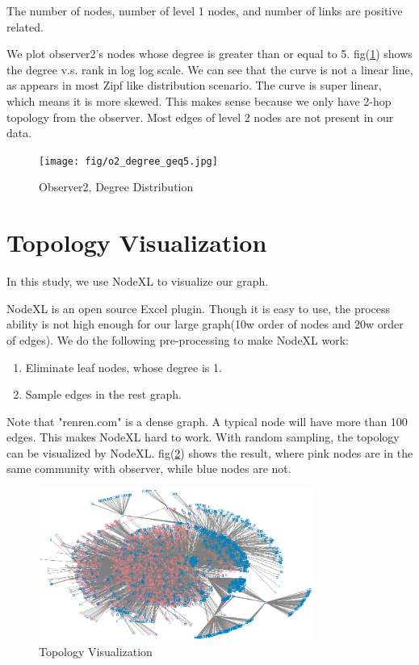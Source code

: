 \documentclass[11pt,a4paper]{article}
\begin{document}
The number of nodes, number of level 1 nodes, and number of links
are positive related.

We plot observer2's nodes whose degree is greater than or equal to 5. 
fig(\ref{fig:o2_degree}) shows the degree v.s. rank in log log scale. 
We can see that the curve is not a linear line, as appears 
in most Zipf like distribution scenario. The curve is 
super linear, which means it is more skewed. This makes
sense because we only have 2-hop topology from the observer. 
Most edges of level 2 nodes are not present in our data. 

\begin{figure}
	\centering
	\texttt{[image: fig/o2\_degree\_geq5.jpg]}
	\caption{Observer2, Degree Distribution}
	\label{fig:o2_degree}
\end{figure}

\section{Topology Visualization}

In this study, we use NodeXL \cite{nodexl} to visualize our graph. 

NodeXL is an open source Excel plugin. Though it is easy to use, 
the process ability is not high enough for our large graph(10w order 
of nodes and 20w order of edges). We do the following 
pre-processing to make NodeXL work:
\begin{enumerate}
	\item Eliminate leaf nodes, whose degree is 1. 
	\item Sample edges in the rest graph. 
\end{enumerate}
Note that "renren.com" is a dense graph. A typical node will have 
more than 100 edges. This makes NodeXL hard to work. With random
sampling, the topology can be visualized by NodeXL. fig(\ref{fig:topo_vis})
shows the result, where pink nodes are in the same community with 
observer, while blue nodes are not. 

\begin{figure}[htb]
	\centering
	\includegraphics[width=0.8\textwidth]{../visualization/sample1W_3.png}
	\caption{Topology Visualization}
	\label{fig:topo_vis}
\end{figure}
\end{document}
